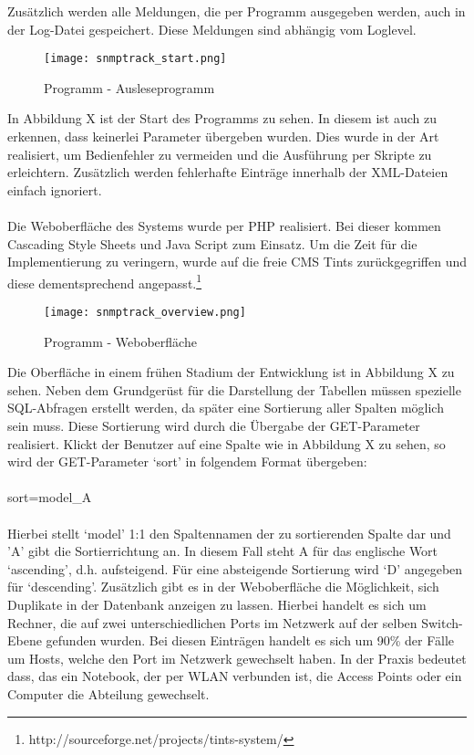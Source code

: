 Zusätzlich werden alle Meldungen, die per Programm ausgegeben werden, auch in der Log-Datei gespeichert.
Diese Meldungen sind abhängig vom Loglevel.
\\
\begin{figure}[H]
\centering
\texttt{[image: snmptrack\_start.png]}
\caption{Programm - Ausleseprogramm}
\label{fig:show_s1_s2_p1_n1}
\end{figure}
In Abbildung X ist der Start des Programms zu sehen. In diesem ist auch zu erkennen, dass keinerlei Parameter übergeben wurden. Dies wurde in der Art realisiert, um Bedienfehler zu vermeiden und die Ausführung per Skripte zu erleichtern.
Zusätzlich werden fehlerhafte Einträge innerhalb der XML-Dateien einfach ignoriert.\\\\
Die Weboberfläche des Systems wurde per PHP realisiert.
Bei dieser kommen Cascading Style Sheets und Java Script zum Einsatz.
Um die Zeit für die Implementierung zu veringern, wurde auf die freie CMS Tints zurückgegriffen und diese dementsprechend angepasst.\footnote{http://sourceforge.net/projects/tints-system/}
\\
\begin{figure}[H]
\centering
\texttt{[image: snmptrack\_overview.png]}
\caption{Programm - Weboberfläche}
\label{fig:show_s1_s2_p1_n1}
\end{figure}
Die Oberfläche in einem frühen Stadium der Entwicklung ist in Abbildung X zu sehen.
Neben dem Grundgerüst für die Darstellung der Tabellen müssen spezielle SQL-Abfragen erstellt werden, da später eine Sortierung aller Spalten möglich sein muss.
Diese Sortierung wird durch die Übergabe der GET-Parameter realisiert. Klickt der Benutzer auf eine Spalte wie in Abbildung X zu sehen, so wird der GET-Parameter ‘sort’ in folgendem Format übergeben:\\
\\
sort=model\_A\\
\\
Hierbei stellt ‘model’ 1:1 den Spaltennamen der zu sortierenden Spalte dar und 'A' gibt die Sortierrichtung an. In diesem Fall steht A für das englische Wort ‘ascending’, d.h. aufsteigend. Für eine absteigende Sortierung wird ‘D’ angegeben für ‘descending’.
Zusätzlich gibt es in der Weboberfläche die Möglichkeit, sich Duplikate in der Datenbank anzeigen zu lassen.
Hierbei handelt es sich um Rechner, die auf zwei unterschiedlichen Ports im Netzwerk auf der selben Switch-Ebene gefunden wurden.
Bei diesen Einträgen handelt es sich um 90\% der Fälle um Hosts, welche den Port im Netzwerk gewechselt haben.
In der Praxis bedeutet dass, das ein Notebook, der per WLAN verbunden ist, die Access Points oder ein Computer die Abteilung gewechselt.

